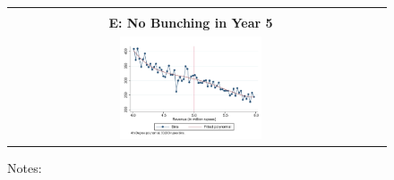 \begin{figure}[t]
\begin{centering}
\begin{tabular}{cc}
\vspace{0.2cm}
  & \tabularnewline
\textbf{E: No Bunching in Year 5}  & \tabularnewline
\includegraphics[width=0.4\textwidth]{graphs/BunchingYear5_5Million_Degree4_30000}  & \tabularnewline
\end{tabular}
\par\end{centering}
{\footnotesize{}{}{}Notes: }{\footnotesize \par}
\end{figure}

\newpage{}

